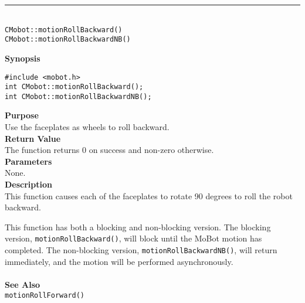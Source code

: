 \noindent
\vspace{5pt}
\rule{4.5in}{0.015in}\\
\noindent
{\LARGE \texttt{CMobot::motionRollBackward()}}\\
{\LARGE \texttt{CMobot::motionRollBackwardNB()}}\\
{}

\noindent
{\bf Synopsis}\\
\begin{verbatim}
#include <mobot.h>
int CMobot::motionRollBackward();
int CMobot::motionRollBackwardNB();
\end{verbatim}

\noindent
{\bf Purpose}\\
Use the faceplates as wheels to roll backward.\\

\noindent
{\bf Return Value}\\
The function returns 0 on success and non-zero otherwise.\\

\noindent
{\bf Parameters}\\
None.\\

\noindent
{\bf Description}\\
This function causes each of the faceplates to rotate 90 degrees to roll the
robot backward.

This function has both a blocking and non-blocking version.
The blocking version, \texttt{motionRollBackward()}, will block until the
MoBot motion has completed. The non-blocking version, \texttt{motionRollBackwardNB()},
will return immediately, and the motion will be performed asynchronously.\\
\\

\noindent
{\bf See Also}\\
\texttt{motionRollForward()}

